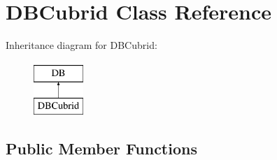 \hypertarget{classDBCubrid}{\section{D\-B\-Cubrid Class Reference}
\label{classDBCubrid}
}
Inheritance diagram for D\-B\-Cubrid\-:\begin{figure}[H]
\begin{center}
\leavevmode
\includegraphics[height=2.000000cm]{classDBCubrid}
\end{center}
\end{figure}
\subsection*{Public Member Functions}
